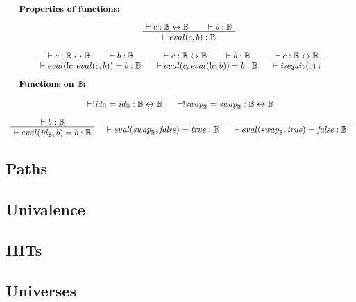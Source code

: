 \documentclass[format=acmlarge,review,natbib]{acmart}
\newcommand{\invc}[1]{!#1}
\newcommand{\evalone}[2]{eval(#1,#2)}
\newcommand{\isequiv}[1]{\mathit{isequiv}(#1)}
\newcommand{\idc}{\mathit{id}_{\boolt}}
\newcommand{\swapc}{\mathit{swap}_{\boolt}}
\newcommand{\iso}{\leftrightarrow}
\newcommand{\fc}{\mathit{false}}
\newcommand{\tc}{\mathit{true}}
\newcommand{\boolt}{\mathbb{B}}
\newcommand{\proves}{\vdash}
\newcommand{\jdg}[2]{\proves #1 : #2}
\begin{document}
\[\begin{array}{c}
    \noalign{\textbf{Properties of functions:}} \\
    \quad
    \quad
    \AxiomC{$\jdg{c}{\boolt\iso\boolt}$}
    \AxiomC{$\jdg{b}{\boolt}$}
    \BinaryInfC{$\jdg{\evalone{c}{b}}{\boolt}$}
    \DisplayProof
    \\
    \\
    \AxiomC{$\jdg{c}{\boolt\iso\boolt}$}
    \AxiomC{$\jdg{b}{\boolt}$}
    \BinaryInfC{$\jdg{\evalone{\invc{c}}{\evalone{c}{b}} = b}{\boolt}$}
    \DisplayProof
    \quad
    \AxiomC{$\jdg{c}{\boolt\iso\boolt}$}
    \AxiomC{$\jdg{b}{\boolt}$}
    \BinaryInfC{$\jdg{\evalone{c}{\evalone{\invc{c}}{b}} = b}{\boolt}$}
    \DisplayProof
    \quad
    \AxiomC{$\jdg{c}{\boolt\iso\boolt}$}
    \UnaryInfC{$\jdg{\isequiv{c}}{}$}
    \DisplayProof
    \\
    \\
    \noalign{\textbf{Functions on $\boolt$:}} \\
    \AxiomC{}
    \UnaryInfC{$\jdg{\invc{\idc = \idc}}{\boolt\iso\boolt}$}
    \DisplayProof
    \quad
    \AxiomC{}
    \UnaryInfC{$\jdg{\invc{\swapc } = \swapc }{\boolt\iso\boolt}$}
    \DisplayProof
    \\
    \\
    \AxiomC{$\jdg{b}{\boolt}$}
    \UnaryInfC{$\jdg{\evalone{\idc}{b} = b}{\boolt}$}
    \DisplayProof
    \quad
    \AxiomC{}
    \UnaryInfC{$\jdg{\evalone{\swapc}{\fc} = \tc}{\boolt}$}
    \DisplayProof
    \quad
    \AxiomC{}
    \UnaryInfC{$\jdg{\evalone{\swapc}{\tc} = \fc}{\boolt}$}
    \DisplayProof
\end{array}\]

\subsection{Paths}

\subsection{Univalence}

\subsection{HITs}

\newpage

\subsection{Universes}
\end{document}
